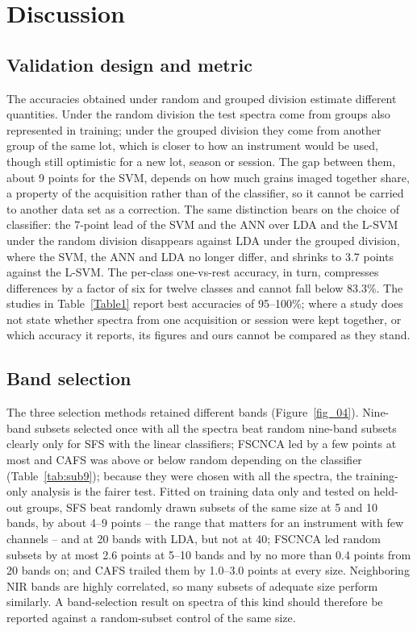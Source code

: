 \documentclass[final,5p,times,twocolumn]{elsarticle}
\newcommand{\added}[1]{#1}
\begin{document}
\added{\section{Discussion}\label{sec_discussion}

\subsection{Validation design and metric}
The accuracies obtained under random and grouped division estimate different quantities. Under the random division the test spectra come from groups also represented in training; under the grouped division they come from another group of the same lot, which is closer to how an instrument would be used, though still optimistic for a new lot, season or session. The gap between them, about 9 points for the SVM, depends on how much grains imaged together share, a property of the acquisition rather than of the classifier, so it cannot be carried to another data set as a correction. The same distinction bears on the choice of classifier: the 7-point lead of the SVM and the ANN over LDA and the L-SVM under the random division disappears against LDA under the grouped division, where the SVM, the ANN and LDA no longer differ, and shrinks to 3.7 points against the L-SVM. The per-class one-vs-rest accuracy, in turn, compresses differences by a factor of six for twelve classes and cannot fall below 83.3\%. The studies in Table~\ref{Table1} report best accuracies of 95--100\%; where a study does not state whether spectra from one acquisition or session were kept together, or which accuracy it reports, its figures and ours cannot be compared as they stand.

\subsection{Band selection}
The three selection methods retained different bands (Figure~\ref{fig_04}). Nine-band subsets selected once with all the spectra beat random nine-band subsets clearly only for SFS with the linear classifiers; FSCNCA led by a few points at most and CAFS was above or below random depending on the classifier (Table~\ref{tab:sub9}); because they were chosen with all the spectra, the training-only analysis is the fairer test. Fitted on training data only and tested on held-out groups, SFS beat randomly drawn subsets of the same size at 5 and 10 bands, by about 4--9 points -- the range that matters for an instrument with few channels -- and at 20 bands with LDA, but not at 40; FSCNCA led random subsets by at most 2.6 points at 5--10 bands and by no more than 0.4 points from 20 bands on; and CAFS trailed them by 1.0--3.0 points at every size. Neighboring NIR bands are highly correlated, so many subsets of adequate size perform similarly. A band-selection result on spectra of this kind should therefore be reported against a random-subset control of the same size.

}
\end{document}

